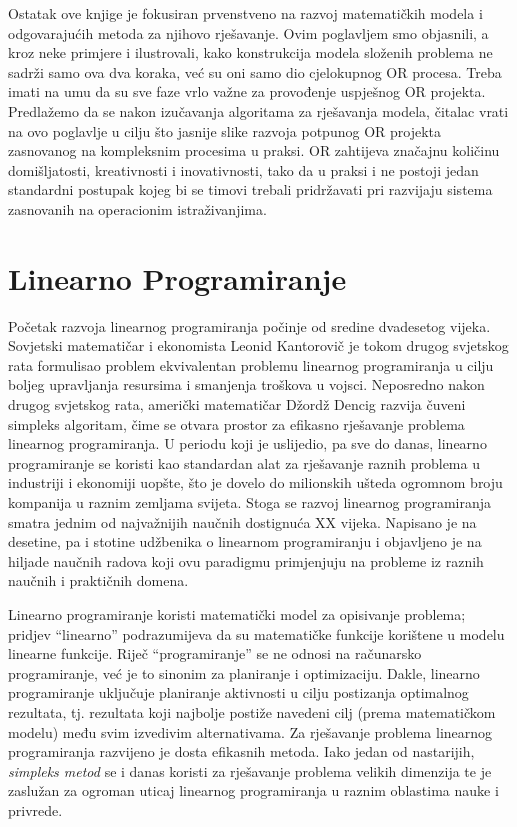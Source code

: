 \documentclass[a4paper, utf8, 11pt, colorlinks]{book}
\begin{document}
Ostatak ove knjige je fokusiran prvenstveno na razvoj matematičkih modela i odgovarajućih metoda za njihovo rješavanje. Ovim poglavljem smo objasnili, a kroz neke primjere i ilustrovali, kako konstrukcija modela složenih problema ne sadrži samo ova dva koraka, već su oni samo dio cjelokupnog OR procesa. Treba imati na umu da su sve faze vrlo važne za provođenje uspješnog OR projekta. Predlažemo da se nakon izučavanja algoritama za rješavanja modela, čitalac vrati na ovo poglavlje u cilju što jasnije slike razvoja potpunog OR projekta zasnovanog na kompleksnim procesima u praksi.  OR zahtijeva značajnu količinu domišljatosti, kreativnosti i inovativnosti, tako da u praksi i ne postoji jedan standardni postupak kojeg bi se timovi trebali pridržavati pri razvijaju sistema zasnovanih na operacionim istraživanjima. %

\chapter{Linearno Programiranje} 
  
  Početak razvoja linearnog programiranja počinje od sredine dvadesetog vijeka. Sovjetski matematičar i ekonomista Leonid Kantorovič je tokom drugog svjetskog rata formulisao problem ekvivalentan problemu linearnog programiranja u cilju boljeg upravljanja resursima i smanjenja troškova u vojsci. Neposredno nakon drugog svjetskog rata, američki matematičar Džordž Dencig razvija čuveni simpleks algoritam, čime se otvara prostor za efikasno rješavanje problema linearnog programiranja. U periodu koji je uslijedio, pa sve do danas, linearno programiranje se koristi kao standardan alat za rješavanje raznih problema u industriji i ekonomiji uopšte, što je dovelo do   milionskih ušteda ogromnom broju kompanija u raznim zemljama svijeta. Stoga se 
razvoj linearnog programiranja  smatra jednim od najvažnijih naučnih dostignu\-ća XX vijeka.  Napisano je na desetine, pa i stotine udžbenika
o linearnom programiranju i objavljeno je na hiljade naučnih radova koji   ovu paradigmu primjenjuju na probleme iz raznih naučnih i praktičnih domena. 

Linearno programiranje koristi matematički model za opisivanje problema; 
pridjev ``linearno'' podrazumijeva da su  matematičke funkcije korištene u modelu linearne funkcije. Riječ ``programiranje'' se ne odnosi na računarsko programiranje, već je to sinonim za planiranje i optimizaciju. Dakle, linearno programiranje uključuje planiranje aktivnosti u cilju postizanja optimalnog rezultata, tj. rezultata koji najbolje postiže navedeni cilj (prema matematičkom modelu) među svim izvedivim alternativama.  Za rješavanje problema linearnog programiranja razvijeno je dosta efikasnih metoda. Iako jedan od nastarijih,  \emph{simpleks metod} se i danas koristi za rješavanje problema velikih dimenzija te je zaslužan za ogroman uticaj linearnog  programiranja u raznim oblastima nauke i privrede.
\end{document}
